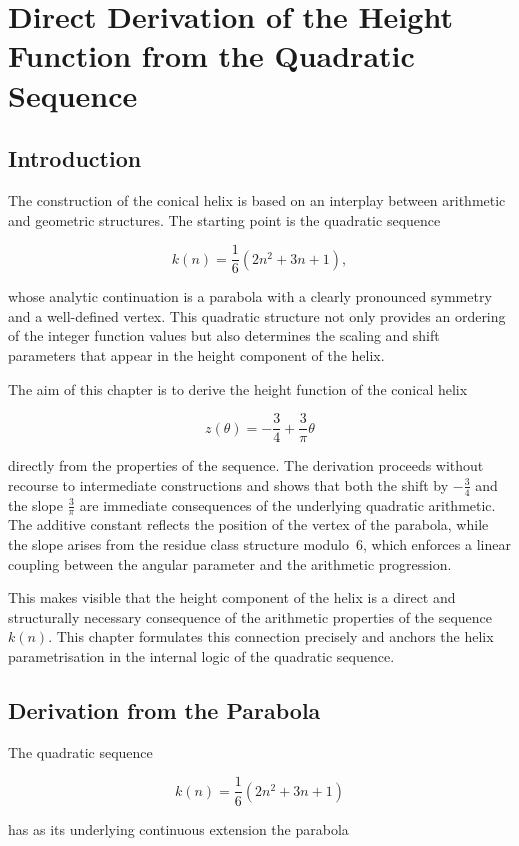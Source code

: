 \chapter{Direct Derivation of the Height Function from the Quadratic Sequence}\label{ch:parabola_helix}
\section{Introduction}

The construction of the conical helix is based on an interplay
between arithmetic and geometric structures. The starting point is the
quadratic sequence

\[
k(n)=\frac{1}{6}(2n^{2}+3n+1),
\]

whose analytic continuation is a parabola with a clearly pronounced
symmetry and a well-defined vertex. This quadratic structure not only
provides an ordering of the integer function values but also
determines the scaling and shift parameters that appear in the height
component of the helix.

The aim of this chapter is to derive the height function of the conical
helix

\[
z(\theta)=-\frac{3}{4}+\frac{3}{\pi}\theta
\]

directly from the properties of the sequence. The derivation proceeds
without recourse to intermediate constructions and shows that both the
shift by $-\tfrac{3}{4}$ and the slope $\tfrac{3}{\pi}$ are immediate
consequences of the underlying quadratic arithmetic. The additive
constant reflects the position of the vertex of the parabola, while the
slope arises from the residue class structure modulo~$6$, which enforces
a linear coupling between the angular parameter and the arithmetic
progression.

This makes visible that the height component of the helix is a direct
and structurally necessary consequence of the arithmetic properties of
the sequence $k(n)$. This chapter formulates this connection precisely
and anchors the helix parametrisation in the internal logic of the
quadratic sequence.

\section{Derivation from the Parabola}

The quadratic sequence

\[
k(n)=\frac{1}{6}(2n^{2}+3n+1)
\]

has as its underlying continuous extension the parabola

